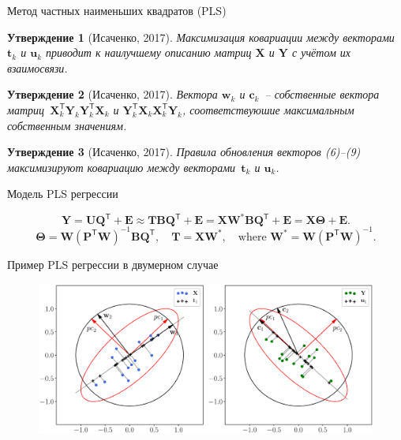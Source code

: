 \documentclass[9pt]{beamer}
\newcommand{\bw}{\mathbf{w}}
\newcommand{\bY}{\mathbf{Y}}
\newcommand{\bX}{\mathbf{X}}
\newcommand{\bu}{\mathbf{u}}
\newcommand{\bt}{\mathbf{t}}
\newcommand{\bc}{\mathbf{c}}
\newcommand{\bP}{\mathbf{P}}
\newcommand{\bT}{\mathbf{T}}
\newcommand{\bB}{\mathbf{B}}
\newcommand{\bQ}{\mathbf{Q}}
\newcommand{\bE}{\mathbf{E}}
\newcommand{\bU}{\mathbf{U}}
\newcommand{\bW}{\mathbf{W}}
\newcommand{\bTheta}{\boldsymbol{\Theta}}
\newcommand{\T}{\mathsf{T}}
\newtheorem{statement}{Утверждение}
\begin{document}
\begin{frame}{Метод частных наименьших квадратов (PLS)}

\begin{statement}[Исаченко, 2017]
Максимизация ковариации между векторами~$\bt_k$ и $\bu_k$ приводит к наилучшему описанию матриц $\bX$ и $\bY$ с учётом их взаимосвязи.
\end{statement}
\begin{statement}[Исаченко, 2017]
Вектора $\bw_k$ и $\bc_k$~-- собственные вектора матриц~$\bX_k^{\T} \bY_k \bY_k^{\T} \bX_k$ и $\bY_k^{\T} \bX_k \bX_k^{\T} \bY_k$, соответствуюшие максимальным собственным значениям.
\end{statement}
\begin{statement}[Исаченко, 2017]
Правила обновления векторов (6)--(9) максимизируют ковариацию между векторами~$\bt_k$ и $\bu_k$.
\end{statement}

\begin{block}{Модель PLS регрессии}

\[
\bY = \bU \bQ^{\T} + \bE \approx \bT \bB \bQ^{\T}+ \bE = \bX \bW^* \bB \bQ^{\T} + \bE = \bX \bTheta + \bE.
\]
\vspace{0.1cm}
\[
\bTheta = \bW (\bP^{\T} \bW)^{-1} \bB \bQ^{\T}, \quad \bT = \bX \bW^*, \quad \text{where } \bW^* = \bW (\bP^{\T} \bW)^{-1}.
\]
\end{block}
\end{frame}
\begin{frame}{Пример PLS регрессии в двумерном случае}
\begin{figure}[h]
\centering
\includegraphics[width=\linewidth]{figs/PLSFigure.eps}
\end{figure}
\end{frame}
\end{document}
